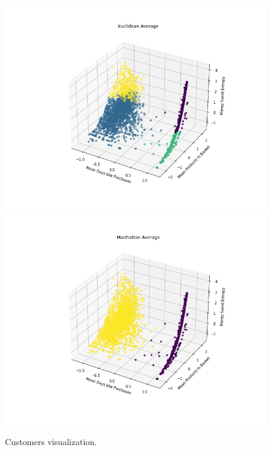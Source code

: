 \documentclass[12pt]{article}
\begin{document}
\begin{figure}[!h]
    \includegraphics[width=\linewidth]{images/figure_customers_euclidean_average_selected_features_3d.png}
\endminipage\hfill
{}
  \includegraphics[width=\linewidth]{images/figure_customers_manhattan_average_selected_features_3d.png}
\endminipage\hfill
\caption{Customers visualization.}
\label{fig:customers_3d}
\end{figure}
\end{document}

